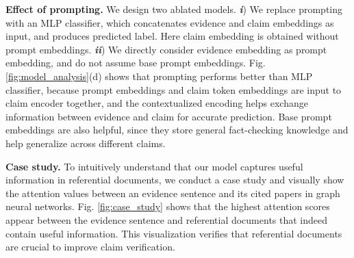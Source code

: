 \textbf{Effect of prompting.} We design two ablated models. \emph{\textbf{i}}) We replace prompting with an MLP classifier, which concatenates evidence and claim embeddings as input, and produces predicted label. Here claim embedding is obtained without prompt embeddings. \emph{\textbf{ii}}) We directly consider evidence embedding as prompt embedding, and do not assume base prompt embeddings. Fig. \ref{fig:model_analysis}(d) shows that prompting performs better than MLP classifier, because prompt embeddings and claim token embeddings are input to claim encoder together, and the contextualized encoding helps exchange information between evidence and claim for accurate prediction. Base prompt embeddings are also helpful, since they store general fact-checking knowledge and help generalize across different claims.

\textbf{Case study.} To intuitively understand that our model captures useful information in referential documents, we conduct a case study and visually show the attention values between an evidence sentence and its cited papers in graph neural networks. Fig. \ref{fig:case_study} shows that the highest attention scores appear between the evidence sentence and referential documents that indeed contain useful information. This visualization verifies that referential documents are crucial to improve claim verification.